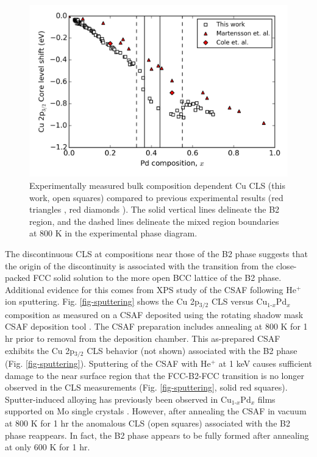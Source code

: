 \documentclass[number, sort&compress, review, 12pt]{elsarticle}
\begin{document}
\begin{figure}[H]
\centering
\includegraphics[width=6in]{./images/experiment.png}
\caption{\label{fig-lit}Experimentally measured bulk composition dependent Cu CLS (this work, open squares) compared to previous experimental results (red triangles \cite{martensson-1981-elect-cu}, red diamonds \cite{cole-1997-deter-charg}). The solid vertical lines delineate the B2 region, and the dashed lines delineate the mixed region boundaries at 800 K in the experimental phase diagram.}
\end{figure}

The discontinuous CLS at compositions near those of the B2 phase suggests that the origin of the discontinuity is associated with the transition from the close-packed FCC solid solution to the more open BCC lattice of the B2 phase. Additional evidence for this comes from XPS study of the CSAF following He$^{\text{+}}$ ion sputtering. Fig. \ref{fig-sputtering} shows the Cu 2p$_{\text{3/2}}$ CLS versus Cu$_{\text{1-}x}$Pd$_x$ composition as measured on a CSAF deposited using the rotating shadow mask CSAF deposition tool \cite{fleutot-2012-appar-depos}.  The CSAF preparation includes annealing at 800 K for 1 hr prior to removal from the deposition chamber. This as-prepared CSAF exhibits the Cu 2p$_{\text{3/2}}$ CLS behavior (not shown) associated with the B2 phase (Fig. \ref{fig-sputtering}). Sputtering of the CSAF with He$^+$ at 1 keV causes sufficient damage to the near surface region that the FCC-B2-FCC transition is no longer observed in the CLS measurements (Fig. \ref{fig-sputtering}, solid red squares). Sputter-induced alloying has previously been observed in Cu$_{\text{1-}x}$Pd$_x$ films supported on Mo single crystals \cite{rainer-1995-core-level}. However, after annealing the CSAF in vacuum at 800 K for 1 hr the anomalous CLS (open squares) associated with the B2 phase reappears. In fact, the B2 phase appears to be fully formed after annealing at only 600 K for 1 hr.
\end{document}
